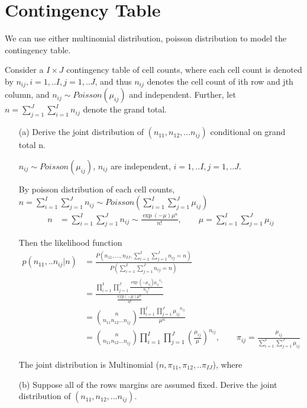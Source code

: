 \section{Contingency Table}

We can use either multinomial distribution, poisson distribution to model the contingency table.

Consider a $I \times J$ contingency table of cell counts, where each cell count is denoted by $n_{ij}, i=1,..I, j=1,..J$, and thus $n_{ij}$ denotes the cell count of ith row and jth column, and $n_{ij} \sim Poisson (\mu_{ij})$ and independent. Further, let $n= \sum_{j=1}^J \sum_{i=1}^I n_{ij}$ denote the grand total.

\begin{itemize}

	\item [(a)] Derive the joint distribution of $(n_{11}, n_{12},... n_{ij})$ conditional on grand total n.
	
	$n_{ij} \sim Poisson(\mu_{ij})$, $n_{ij}$ are independent, $i=1,..I, j=1,..J$.
	
	By poisson distribution of each cell counts, $n= \sum_{i=1}^I \sum_{j=1}^J n_{ij} \sim Poisson(\sum_{i=1}^I \sum_{j=1}^J \mu_{ij})$
	\begin{align*}
		n &= \sum_{i=1}^I \sum_{j=1}^J n_{ij} \sim \frac{\exp(-\mu) \mu^n }{n!}, \qquad \mu= \sum_{i=1}^I \sum_{j=1}^J \mu_{ij}
	\end{align*}	
	
	Then the likelihood function
	\begin{align*}
	p(n_{11},..n_{ij}| n) &= \frac{P(n_{11}, …, n_{IJ}, \sum_{i=1}^I \sum_{j=1}^J n_{ij} = n)}{P(\sum_{i=1}^I \sum_{j=1}^J n_{ij} = n)} \\
		&= \frac{\prod_{i=1}^I \prod_{j=1}^J \frac{\exp(-\mu_{ij})  {\mu_{ij}}^{n_{ij}}}{n_{ij}!}}{\frac{exp(-\mu) \mu^n }{n!}} \\
		&= {n \choose n_{11} n_{12} ... n_{ij}} \frac{\prod_{i=1}^I \prod_{j=1}^J {\mu_{ij}}^{n_{ij}}}{\mu^n } \\
	&= {n \choose n_{11} n_{12} ... n_{ij}} \prod_{i=1}^I \prod_{j=1}^J \left( \frac{\mu_{ij}}{\mu } \right)^{n_{ij}}, \qquad \pi_{ij} = \frac{\mu_{ij}}{\sum_{i=1}^I \sum_{j=1}^J \mu_{ij}}
	\end{align*}
		
The joint distribution is Multinomial ($n, \pi_{11}, \pi_{12},.. \pi_{IJ}$), where 

	\item [(b)] Suppose all of the rows margins are assumed fixed. Derive the joint distribution of $(n_{11}, n_{12},... n_{ij})$.
	

\end{itemize}
